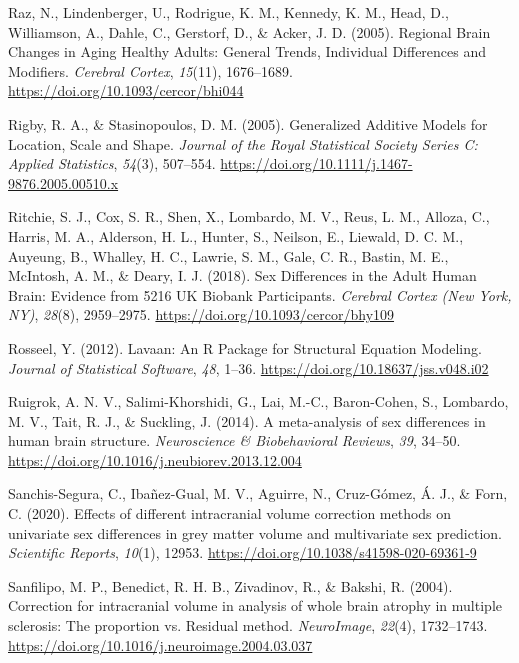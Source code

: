\documentclass[
]{article}
\newlength{\cslhangindent}
\newenvironment{CSLReferences}[2] %
 {\begin{list}{}{%
  \setlength{\itemindent}{0pt}
  \setlength{\leftmargin}{0pt}
  \setlength{\parsep}{0pt}
  \ifodd #1
   \setlength{\leftmargin}{\cslhangindent}
   \setlength{\itemindent}{-1\cslhangindent}
  \fi
  \setlength{\itemsep}{#2\baselineskip}}}
 {\end{list}}
\begin{document}
\begin{CSLReferences}{1}{0}
Raz, N., Lindenberger, U., Rodrigue, K. M., Kennedy, K. M., Head, D.,
Williamson, A., Dahle, C., Gerstorf, D., \& Acker, J. D. (2005).
Regional {Brain} {Changes} in {Aging} {Healthy} {Adults}: {General}
{Trends}, {Individual} {Differences} and {Modifiers}. \emph{Cerebral
Cortex}, \emph{15}(11), 1676--1689.
\url{https://doi.org/10.1093/cercor/bhi044}

Rigby, R. A., \& Stasinopoulos, D. M. (2005). Generalized {Additive}
{Models} for {Location}, {Scale} and {Shape}. \emph{Journal of the Royal
Statistical Society Series C: Applied Statistics}, \emph{54}(3),
507--554. \url{https://doi.org/10.1111/j.1467-9876.2005.00510.x}

Ritchie, S. J., Cox, S. R., Shen, X., Lombardo, M. V., Reus, L. M.,
Alloza, C., Harris, M. A., Alderson, H. L., Hunter, S., Neilson, E.,
Liewald, D. C. M., Auyeung, B., Whalley, H. C., Lawrie, S. M., Gale, C.
R., Bastin, M. E., McIntosh, A. M., \& Deary, I. J. (2018). Sex
{Differences} in the {Adult} {Human} {Brain}: {Evidence} from 5216 {UK}
{Biobank} {Participants}. \emph{Cerebral Cortex (New York, NY)},
\emph{28}(8), 2959--2975. \url{https://doi.org/10.1093/cercor/bhy109}

Rosseel, Y. (2012). Lavaan: {An} {R} {Package} for {Structural}
{Equation} {Modeling}. \emph{Journal of Statistical Software},
\emph{48}, 1--36. \url{https://doi.org/10.18637/jss.v048.i02}

Ruigrok, A. N. V., Salimi-Khorshidi, G., Lai, M.-C., Baron-Cohen, S.,
Lombardo, M. V., Tait, R. J., \& Suckling, J. (2014). A meta-analysis of
sex differences in human brain structure. \emph{Neuroscience \&
Biobehavioral Reviews}, \emph{39}, 34--50.
\url{https://doi.org/10.1016/j.neubiorev.2013.12.004}

Sanchis-Segura, C., Ibañez-Gual, M. V., Aguirre, N., Cruz-Gómez, Á. J.,
\& Forn, C. (2020). Effects of different intracranial volume correction
methods on univariate sex differences in grey matter volume and
multivariate sex prediction. \emph{Scientific Reports}, \emph{10}(1),
12953. \url{https://doi.org/10.1038/s41598-020-69361-9}

Sanfilipo, M. P., Benedict, R. H. B., Zivadinov, R., \& Bakshi, R.
(2004). Correction for intracranial volume in analysis of whole brain
atrophy in multiple sclerosis: The proportion vs. Residual method.
\emph{NeuroImage}, \emph{22}(4), 1732--1743.
\url{https://doi.org/10.1016/j.neuroimage.2004.03.037}


\end{CSLReferences}
\end{document}
